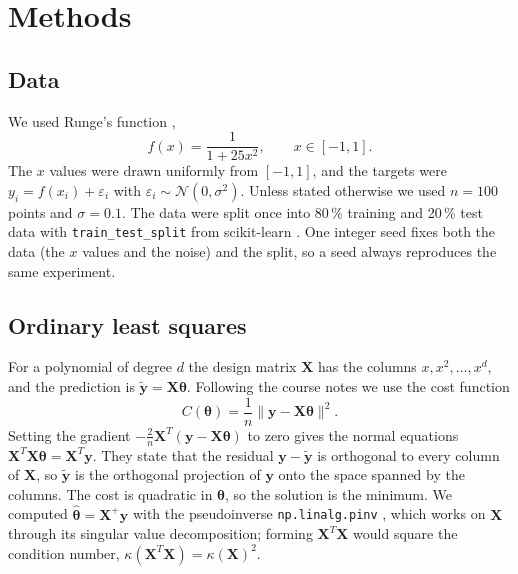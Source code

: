 
\section{Methods}\label{sec:methods}

\subsection{Data}\label{sec:data}

We used Runge's function \cite{Runge1901},
$$
f(x) = \frac{1}{1 + 25x^2}, \qquad x \in [-1, 1].
$$
The $x$ values were drawn uniformly from $[-1, 1]$, and the targets were $y_i = f(x_i) + \varepsilon_i$ with $\varepsilon_i \sim \mathcal{N}(0, \sigma^2)$. Unless stated otherwise we used $n = 100$ points and $\sigma = 0.1$. The data were split once into 80\,\% training and 20\,\% test data with \texttt{train\_test\_split} from scikit-learn \cite{Pedregosa2011}. One integer seed fixes both the data (the $x$ values and the noise) and the split, so a seed always reproduces the same experiment.

\subsection{Ordinary least squares}\label{sec:ols}

For a polynomial of degree $d$ the design matrix $\mathbf{X}$ has the columns $x, x^2, \dots, x^d$, and the prediction is $\tilde{\mathbf{y}} = \mathbf{X}\boldsymbol{\theta}$. Following the course notes \cite{HjorthJensen2026} we use the cost function
$$
C(\boldsymbol{\theta}) = \frac{1}{n}\lVert \mathbf{y} - \mathbf{X}\boldsymbol{\theta} \rVert^2 .
$$
Setting the gradient $-\frac{2}{n}\mathbf{X}^T(\mathbf{y} - \mathbf{X}\boldsymbol{\theta})$ to zero gives the normal equations $\mathbf{X}^T\mathbf{X}\boldsymbol{\theta} = \mathbf{X}^T\mathbf{y}$. They state that the residual $\mathbf{y} - \tilde{\mathbf{y}}$ is orthogonal to every column of $\mathbf{X}$, so $\tilde{\mathbf{y}}$ is the orthogonal projection of $\mathbf{y}$ onto the space spanned by the columns. The cost is quadratic in $\boldsymbol{\theta}$, so the solution is the minimum. We computed $\hat{\boldsymbol{\theta}} = \mathbf{X}^{+}\mathbf{y}$ with the pseudoinverse \texttt{np.linalg.pinv} \cite{Harris2020}, which works on $\mathbf{X}$ through its singular value decomposition; forming $\mathbf{X}^T\mathbf{X}$ would square the condition number, $\kappa(\mathbf{X}^T\mathbf{X}) = \kappa(\mathbf{X})^2$.

